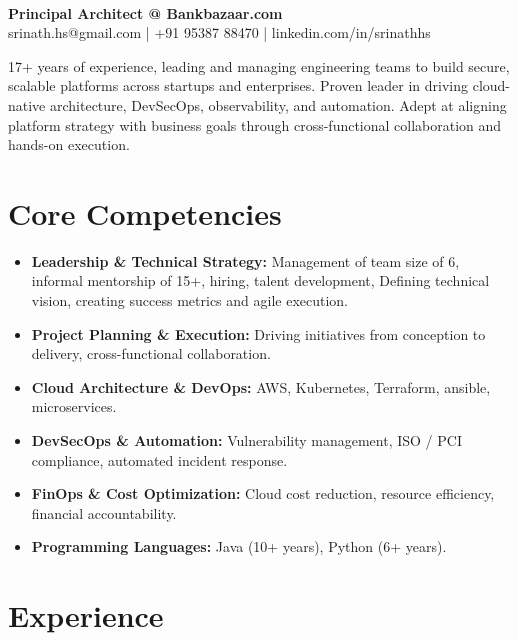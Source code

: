 \documentclass[11pt]{article}
\newcommand{\name}[1]{\noindent{\LARGE\sffamily\textbf{#1}}}
\begin{document}
\pagestyle{empty}
\color{bodytext}

\name{Srinath H S}\\[0.5em]
\textbf{Principal Architect @ Bankbazaar.com}\\[0.3em]
srinath.hs@gmail.com \quad | \quad +91 95387 88470 \quad | \quad linkedin.com/in/srinathhs

17+ years of experience, leading and managing engineering teams to build secure, scalable platforms across startups and enterprises. Proven leader in driving cloud-native architecture, DevSecOps, observability, and automation. Adept at aligning platform strategy with business goals through cross-functional collaboration and hands-on execution.

\section*{Core Competencies}
\begin{itemize}[leftmargin=*, itemsep=-0.5em]
  \item \textbf{Leadership \& Technical Strategy:} Management of team size of 6, informal mentorship of 15+, hiring, talent development, Defining technical vision, creating success metrics and agile execution.
  \item \textbf{Project Planning \& Execution:} Driving initiatives from conception to delivery, cross-functional collaboration.
  \item \textbf{Cloud Architecture \& DevOps:} AWS, Kubernetes, Terraform, ansible, microservices.
  \item \textbf{DevSecOps \& Automation:} Vulnerability management, ISO / PCI compliance, automated incident response.
  \item \textbf{FinOps \& Cost Optimization:} Cloud cost reduction, resource efficiency, financial accountability.
  \item \textbf{Programming Languages:} Java (10+ years), Python (6+ years).
\end{itemize}

\section*{Experience}
\end{document}
